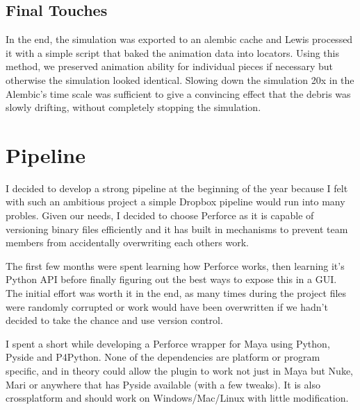 \documentclass[11pt,a4paper,final,notitlepage]{report}
\begin{document}
\section{Final Touches}
In the end, the simulation was exported to an alembic cache and Lewis processed it with a simple script that baked the animation data into locators. Using this method, we preserved animation ability for individual pieces if necessary but otherwise the simulation looked identical. Slowing down the simulation 20x in the Alembic's time scale was sufficient to give a convincing effect that the debris was slowly drifting, without completely stopping the simulation.



\chapter{Pipeline}

I decided to develop a strong pipeline at the beginning of the year because I felt with such an ambitious project a simple Dropbox pipeline would run into many probles. Given our needs, I decided to choose Perforce as it is capable of versioning binary files efficiently and it has built in mechanisms to prevent team members from accidentally overwriting each others work.

The first few months were spent learning how Perforce works, then learning it's Python API before finally figuring out the best ways to expose this in a GUI.
The initial effort was worth it in the end, as many times during the project files were randomly corrupted or work would have been overwritten if we hadn't decided to take the chance and use version control.

I spent a short while developing a Perforce wrapper for Maya using Python, Pyside and P4Python. None of the dependencies are platform or program specific, and in theory could allow the plugin to work not just in Maya but Nuke, Mari or anywhere that has Pyside available (with a few tweaks). It is also crossplatform and should work on Windows/Mac/Linux with little modification.
\end{document}

